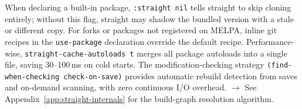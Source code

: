 When declaring a built-in package, \texttt{:straight nil} tells straight to skip cloning entirely; without this flag, straight may shadow the bundled version with a stale or different copy.  For forks or packages not registered on MELPA, inline git recipes in the \texttt{use-package} declaration override the default recipe.  Performance-wise, \texttt{straight-cache-autoloads t} merges all package autoloads into a single file, saving 30--100\,ms on cold starts.  The modification-checking strategy \texttt{(find-when-checking check-on-save)} provides automatic rebuild detection from saves and on-demand scanning, with zero continuous I/O overhead.  \(\rightarrow\) See Appendix~\ref{app:straight-internals} for the build-graph resolution algorithm.
